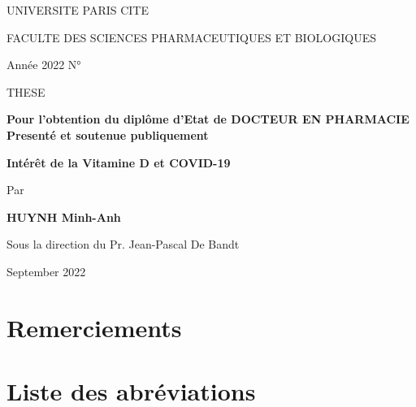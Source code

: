 \documentclass[
  letterpaper,
  DIV=11,
  numbers=noendperiod]{scrartcl}
\author{}
\date{11/29/22}
\begin{document}
\ifdefined\Shaded\renewenvironment{Shaded}{\begin{tcolorbox}[enhanced, breakable, boxrule=0pt, interior hidden, borderline west={3pt}{0pt}{shadecolor}, frame hidden, sharp corners]}{\end{tcolorbox}}\fi


\begin{centering}
\large 

UNIVERSITE PARIS CITE

FACULTE DES SCIENCES PHARMACEUTIQUES ET BIOLOGIQUES

\vspace{1 cm}

Année 2022 \hfill \hfill N°

\vspace{2cm}
THESE

\vspace{1cm} \Large \textbf{Pour l'obtention du diplôme d'Etat de DOCTEUR EN PHARMACIE Presenté et soutenue publiquement}


\Large \textbf {Intérêt de la Vitamine D et COVID-19} \vspace{2 cm}

\large Par \vspace{0.5 cm}

\Large \textbf{HUYNH Minh-Anh} \vspace{1 cm}

\large Sous la direction du Pr. Jean-Pascal De Bandt

September 2022

\end{centering}

\newpage{}

\hypertarget{remerciements}{%
\section*{Remerciements}\label{remerciements}}


\newpage{}

\tableofcontents
\newpage

\listoffigures
\newpage

\listoftables

\newpage{}

\hypertarget{liste-des-abruxe9viations}{%
\section*{Liste des abréviations}\label{liste-des-abruxe9viations}}
\end{document}
